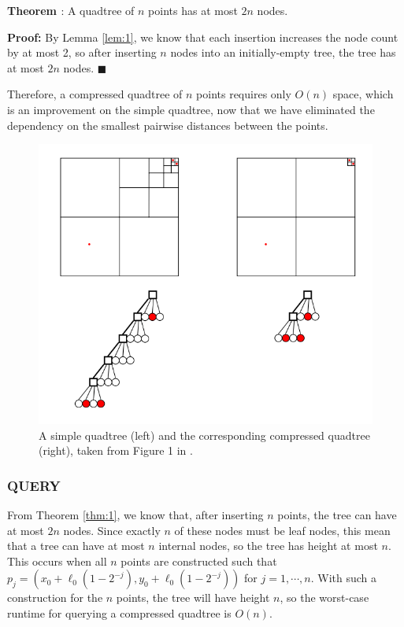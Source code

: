 \documentclass[12pt]{article}
\newcounter{theorem}
\newcommand{\theorem}[0]{\textbf{Theorem \refstepcounter{theorem}\thetheorem\label{thm:\thetheorem}}}
\begin{document}
        \theorem: A quadtree of $n$ points has at most $2n$ nodes.
        
        \textbf{Proof:} By Lemma \ref{lem:1}, we know that each insertion increases the node count by at most 2, so after inserting $n$ nodes into an initially-empty tree, the tree has at most $2n$ nodes. \hfill $\blacksquare$
        
        Therefore, a compressed quadtree of $n$ points requires only $O(n)$ space, which is an improvement on the simple quadtree, now that we have eliminated the dependency on the smallest pairwise distances between the points.
        
        \begin{figure}[ht!]
            \centering
          \includegraphics[scale=0.75]{CompressedQuadtree.png}
          \caption{A simple quadtree (left) and the corresponding compressed quadtree (right), taken from Figure 1 in \cite{sqt}.}
          \label{fig:3}
        \end{figure}
        
        \subsubsection{QUERY}
            From Theorem \ref{thm:1}, we know that, after inserting $n$ points, the tree can have at most $2n$ nodes. Since exactly $n$ of these nodes must be leaf nodes, this mean that a tree can have at most $n$ internal nodes, so the tree has height at most $n$. This occurs when all $n$ points are constructed such that $p_j = (x_0 + \ell_0 (1 - 2^{-j}), y_0 + \ell_0 (1 - 2^{-j}))$ for $j = 1, \cdots, n$. With such a construction for the $n$ points, the tree will have height $n$, so the worst-case runtime for querying a compressed quadtree is $O(n)$.
            
\end{document}
